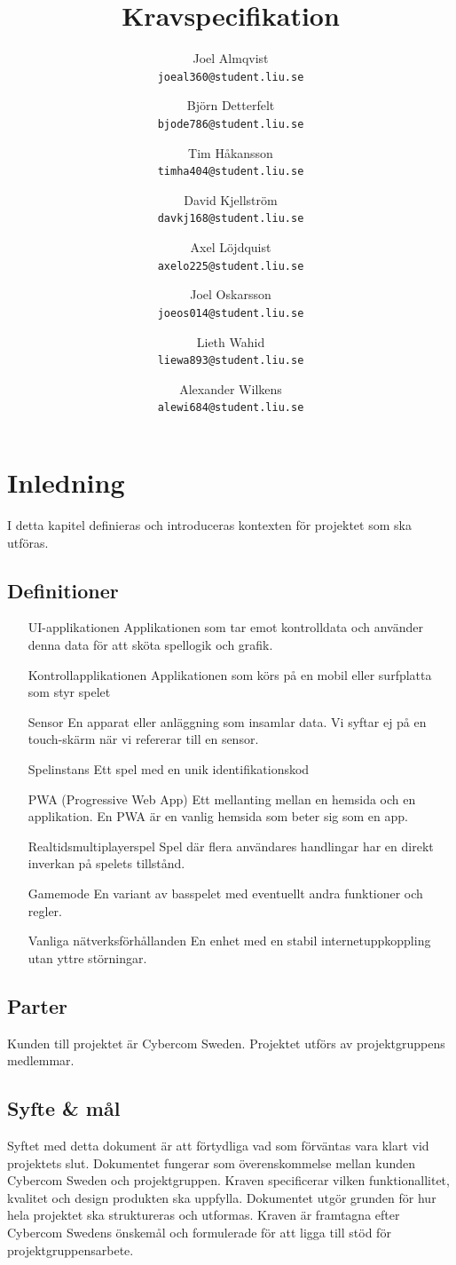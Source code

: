 \documentclass[10pt]{article}
\title{Kravspecifikation}
\author{
    Joel Almqvist\\
    \texttt{joeal360@student.liu.se}
    \and
    Björn Detterfelt\\
    \texttt{bjode786@student.liu.se}
    \and
    Tim Håkansson\\
    \texttt{timha404@student.liu.se}
    \and
    David Kjellström\\
    \texttt{davkj168@student.liu.se}
    \and
    Axel Löjdquist\\
    \texttt{axelo225@student.liu.se}
    \and
    Joel Oskarsson\\
    \texttt{joeos014@student.liu.se}
    \and
    Lieth Wahid\\
    \texttt{liewa893@student.liu.se}
    \and
    Alexander Wilkens\\
    \texttt{alewi684@student.liu.se}
}
\begin{document}
\maketitle
\pagebreak
\tableofcontents
\pagebreak
\section{Inledning}
	I detta kapitel definieras och introduceras kontexten för projektet som ska utföras.

	\subsection{Definitioner}
		\begin{itemize}[leftmargin=5cm]
		\item [UI-applikationen] Applikationen som tar emot kontrolldata och använder denna data för att sköta spellogik och grafik.
		\item [Kontrollapplikationen] Applikationen som körs på en mobil eller surfplatta som styr spelet
		\item [Sensor] En apparat eller anläggning som insamlar data. Vi syftar ej på en touch-skärm när vi refererar till en sensor.
		\item [Spelinstans] Ett spel med en unik identifikationskod
		\item [PWA (Progressive Web App)] Ett mellanting mellan en hemsida och en applikation. En PWA är en vanlig hemsida som beter sig som en app.
		\item [Realtidsmultiplayerspel] Spel där flera användares handlingar har en direkt inverkan på spelets tillstånd.
		\item [Gamemode] En variant av basspelet med eventuellt andra funktioner och regler.
		\item [Vanliga nätverksförhållanden] En enhet med en stabil internetuppkoppling utan yttre störningar.
		\end{itemize}	

	\subsection{Parter}
	Kunden till projektet är Cybercom Sweden. Projektet utförs av projektgruppens medlemmar.
	
	\subsection{Syfte \& mål}
	Syftet med detta dokument är att förtydliga vad som förväntas vara klart vid projektets slut. Dokumentet fungerar som överenskommelse mellan kunden Cybercom Sweden och projektgruppen. Kraven specificerar vilken funktionallitet, kvalitet och design produkten ska uppfylla. Dokumentet utgör grunden för hur hela projektet ska struktureras och utformas. Kraven är framtagna efter Cybercom Swedens önskemål och formulerade för att ligga till stöd för projektgruppensarbete.
	
\end{document}
